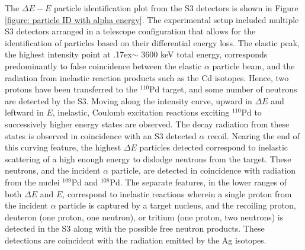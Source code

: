 The $\Delta E - E$ particle identification plot from the S3 detectors is shown in Figure \ref{figure: particle ID with alpha energy}. The experimental setup included multiple S3 detectors arranged in a telescope configuration that allows for the identification of particles based on their differential energy loss. The elastic peak, the highest intensity point at {\raise.17ex\hbox{$\scriptstyle\sim$}} 3600 keV total energy, corresponds predominantly to false coincidence between the elastic $\alpha$ particle beam, and the radiation from inelastic reaction products such as the Cd isotopes. Hence, two protons have been transferred to the $^{110}$Pd target, and some number of neutrons are detected by the S3. Moving along the intensity curve, upward in $\Delta E$ and leftward in $E$, inelastic, Coulomb excitation reactions exciting $^{110}$Pd to successively higher energy states are observed. The decay radiation from these states is observed in coincidence with an S3 detected $\alpha$ recoil. Nearing the end of this curving feature, the highest $\Delta E$ particles detected correspond to inelastic scattering of a high enough energy to dislodge neutrons from the target. These neutrons, and the incident $\alpha$ particle, are detected in coincidence with radiation from the nuclei $^{109}$Pd and $^{108}$Pd. The separate features, in the lower ranges of both $\Delta E$ and $E$, correspond to inelastic reactions wherein a single proton from the incident $\alpha$ particle is captured by a target nucleus, and the recoiling proton, deuteron (one proton, one neutron), or tritium (one proton, two neutrons) is detected in the S3 along with the possible free neutron products. These detections are coincident with the radiation emitted by the Ag isotopes. 

